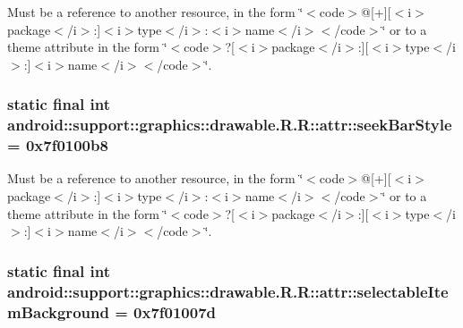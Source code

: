 Must be a reference to another resource, in the form \char`\"{}$<$code$>$@\mbox{[}+\mbox{]}\mbox{[}$<$i$>$package$<$/i$>$:\mbox{]}$<$i$>$type$<$/i$>$:$<$i$>$name$<$/i$>$$<$/code$>$\char`\"{} or to a theme attribute in the form \char`\"{}$<$code$>$?\mbox{[}$<$i$>$package$<$/i$>$:\mbox{]}\mbox{[}$<$i$>$type$<$/i$>$:\mbox{]}$<$i$>$name$<$/i$>$$<$/code$>$\char`\"{}. \hypertarget{classandroid_1_1support_1_1graphics_1_1drawable_1_1_r_1_1attr_6ff64e4c9e17a5c22388ab8e6218ff73}{
\subsubsection[{seekBarStyle}]{\setlength{\rightskip}{0pt plus 5cm}static final int android::support::graphics::drawable.R.R::attr::seekBarStyle = 0x7f0100b8}}
\label{classandroid_1_1support_1_1graphics_1_1drawable_1_1_r_1_1attr_6ff64e4c9e17a5c22388ab8e6218ff73}


Must be a reference to another resource, in the form \char`\"{}$<$code$>$@\mbox{[}+\mbox{]}\mbox{[}$<$i$>$package$<$/i$>$:\mbox{]}$<$i$>$type$<$/i$>$:$<$i$>$name$<$/i$>$$<$/code$>$\char`\"{} or to a theme attribute in the form \char`\"{}$<$code$>$?\mbox{[}$<$i$>$package$<$/i$>$:\mbox{]}\mbox{[}$<$i$>$type$<$/i$>$:\mbox{]}$<$i$>$name$<$/i$>$$<$/code$>$\char`\"{}. \hypertarget{classandroid_1_1support_1_1graphics_1_1drawable_1_1_r_1_1attr_c220798e3d2dc8bf3cdb7b0a0adb411a}{
\subsubsection[{selectableItemBackground}]{\setlength{\rightskip}{0pt plus 5cm}static final int android::support::graphics::drawable.R.R::attr::selectableItemBackground = 0x7f01007d}}
\label{classandroid_1_1support_1_1graphics_1_1drawable_1_1_r_1_1attr_c220798e3d2dc8bf3cdb7b0a0adb411a}


